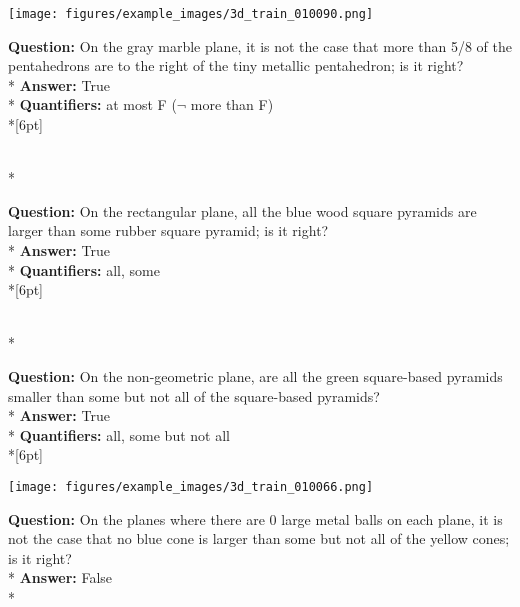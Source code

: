 \begin{figure*}  
\begin{minipage}{0.48\textwidth}
    \texttt{[image: figures/example\_images/3d\_train\_010090.png]}
    \begin{minipage}[t][2.2cm][t]{1\textwidth}
      \footnotesize
      \textbf{Question:} On the gray marble plane, it is not the case that more than 5/8 of the pentahedrons are to the right of the tiny metallic pentahedron; is it right? \\*
      \textbf{Answer:}  True \\*
      \textbf{Quantifiers:}  at most F ($\neg$ more than F) \\*[6pt]
    \end{minipage}\\*
    \begin{minipage}[t][2.2cm][t]{1\textwidth}
      \footnotesize
      \textbf{Question:} On the rectangular plane, all the blue wood square pyramids are larger than some rubber square pyramid; is it right? \\*
      \textbf{Answer:} True \\*
      \textbf{Quantifiers:}  all, some \\*[6pt]
    \end{minipage}\\*
    \begin{minipage}[t][2.2cm][t]{1\textwidth}
      \footnotesize
      \textbf{Question:} On the non-geometric plane, are all the green square-based pyramids smaller than some but not all of the square-based pyramids? \\*
      \textbf{Answer:} True \\*
      \textbf{Quantifiers:} all, some but not all \\*[6pt]
    \end{minipage}
  \end{minipage}
  \hspace{3.5mm}
  \begin{minipage}{0.48\textwidth}
    \texttt{[image: figures/example\_images/3d\_train\_010066.png]}
    \begin{minipage}[t][2.2cm][t]{1\textwidth}
      \footnotesize
      \textbf{Question:}  On the planes where there are 0 large metal balls on each plane, it is not the case that no blue cone is larger than some but not all of the yellow cones; is it right? \\*
      \textbf{Answer:} False \\*

\end{minipage}
\end{minipage}
\end{figure*}
